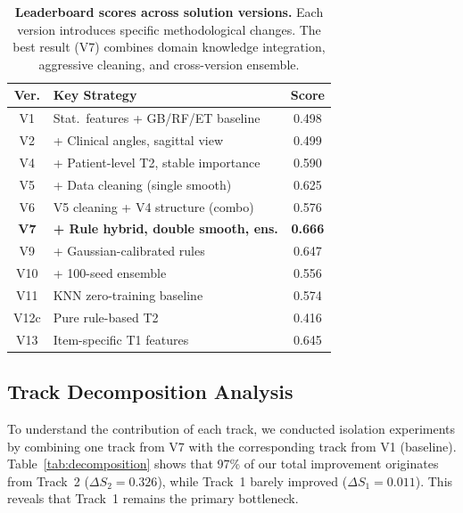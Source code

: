\begin{table}[t]
    \centering
    \small
    \caption{\textbf{Leaderboard scores across solution versions.} Each version introduces specific methodological changes. The best result (V7) combines domain knowledge integration, aggressive cleaning, and cross-version ensemble.}
    \label{tab:main_results}
    \begin{tabular}{clc}
        \toprule
        Ver. & Key Strategy & Score \\
        \midrule
        V1 & Stat.\ features + GB/RF/ET baseline & 0.498 \\
        V2 & + Clinical angles, sagittal view & 0.499 \\
        V4 & + Patient-level T2, stable importance & 0.590 \\
        V5 & + Data cleaning (single smooth) & 0.625 \\
        V6 & V5 cleaning + V4 structure (combo) & 0.576 \\
        \textbf{V7} & \textbf{+ Rule hybrid, double smooth, ens.} & \textbf{0.666} \\
        V9 & + Gaussian-calibrated rules & 0.647 \\
        V10 & + 100-seed ensemble & 0.556 \\
        V11 & KNN zero-training baseline & 0.574 \\
        V12c & Pure rule-based T2 & 0.416 \\
        V13 & Item-specific T1 features & 0.645 \\
        \bottomrule
    \end{tabular}
\end{table}

\subsection{Track Decomposition Analysis}
\label{sec:decomposition}

To understand the contribution of each track, we conducted isolation experiments by combining one track from V7 with the corresponding track from V1 (baseline). Table~\ref{tab:decomposition} shows that 97\% of our total improvement originates from Track~2 ($\Delta S_2 = 0.326$), while Track~1 barely improved ($\Delta S_1 = 0.011$). This reveals that Track~1 remains the primary bottleneck.

